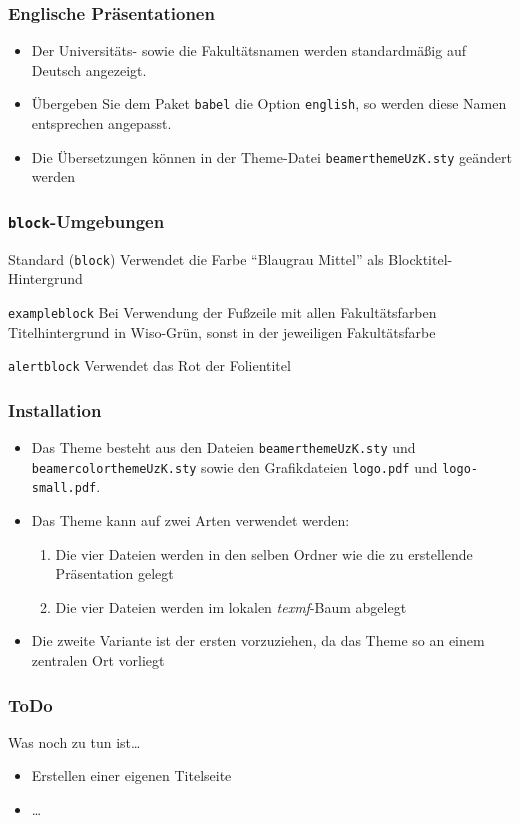 \documentclass[9pt]{beamer}
\begin{document}
\begin{frame}
  \frametitle{Englische Präsentationen}
  \begin{itemize}
  \item Der Universitäts- sowie die Fakultätsnamen werden
    standardmäßig auf Deutsch angezeigt.
  \item Übergeben Sie dem Paket \texttt{babel} die Option
    \texttt{english}, so werden diese Namen entsprechen angepasst.
  \item Die Übersetzungen können in der Theme-Datei
    \texttt{beamerthemeUzK.sty} geändert werden
  \end{itemize}

\end{frame}

\begin{frame}
  \frametitle{\texttt{block}-Umgebungen}
  \begin{block}{Standard (\texttt{block})}
    Verwendet die Farbe "`Blaugrau Mittel"' als Blocktitel-Hintergrund
  \end{block}

  \begin{exampleblock}{\texttt{exampleblock}}
    Bei Verwendung der Fußzeile mit allen Fakultätsfarben
    Titelhintergrund in Wiso-Grün, sonst in der jeweiligen
    Fakultätsfarbe
  \end{exampleblock}

  \begin{alertblock}{\texttt{alertblock}}
    Verwendet das Rot der Folientitel
  \end{alertblock}

\end{frame}


\begin{frame}
  \frametitle{Installation}
  \begin{itemize}
  \item Das Theme besteht aus den Dateien
    \texttt{beamerthemeUzK.sty} und \texttt{beamercolorthemeUzK.sty}
    sowie den Grafikdateien \texttt{logo.pdf} und
    \texttt{logo-small.pdf}.
  \item Das Theme kann auf zwei Arten verwendet werden:
    \begin{enumerate}
    \item Die vier Dateien werden in den selben Ordner wie die zu
      erstellende Präsentation gelegt
    \item Die vier Dateien werden im lokalen \emph{texmf}-Baum abgelegt
    \end{enumerate}
  \item Die zweite Variante ist der ersten vorzuziehen, da das Theme
    so an einem zentralen Ort vorliegt
  \end{itemize}
\end{frame}


\begin{frame}
  \frametitle{ToDo}

  \begin{block}{Was noch zu tun ist\ldots}
    \begin{itemize}
    \item Erstellen einer eigenen Titelseite
    \item \ldots
    \end{itemize}
  \end{block}

\end{frame}
\end{document}
